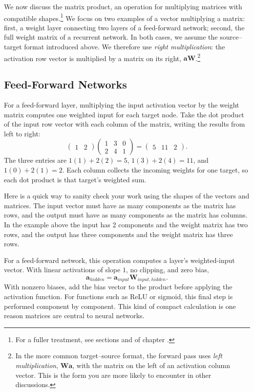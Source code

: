 We now discuss the matrix product, an operation for multiplying matrices with compatible shapes.\footnote{For a fuller treatment, see sections  and  of chapter .} We focus on two examples of a vector multiplying a matrix: first, a weight layer connecting two layers of a feed-forward network; second, the full weight matrix of a recurrent network. In both cases, we assume the source--target format introduced above. We therefore use \emph{right multiplication}: the activation row vector is multiplied by a matrix on its right, $\mathbf{a}\mathbf{W}$.\footnote{In the more common target--source format, the forward pass uses \emph{left multiplication}, $\mathbf{W}\mathbf{a}$, with the matrix on the left of an activation column vector. This is the form you are more likely to encounter in other discussions.}

\subsection{Feed-Forward Networks}

For a feed-forward layer, multiplying the input activation vector by the weight matrix computes one weighted input for each target node. Take the dot product of the input row vector with each column of the matrix, writing the results from left to right:
\[
\begin{pmatrix}1&2\end{pmatrix}
\begin{pmatrix}1&3&0\\2&4&1\end{pmatrix}
=\begin{pmatrix}5&11&2\end{pmatrix}.
\]
The three entries are $1(1)+2(2)=5$, $1(3)+2(4)=11$, and $1(0)+2(1)=2$. Each column collects the incoming weights for one target, so each dot product is that target's weighted sum.

Here is a quick way to sanity check your work using the shapes of the vectors and matrices. The input vector must have as many components as the matrix has rows, and the output must have as many components as the matrix has columns. In the example above the input has 2 components and the weight matrix has two rows, and the output has three components and the weight matrix has three rows.

For a feed-forward network, this operation computes a layer's weighted-input vector. With linear activations of slope $1$, no clipping, and zero bias,
\[
\mathbf{a}_{hidden}=\mathbf{a}_{input}\mathbf{W}_{input,hidden}.
\]
With nonzero biases, add the bias vector to the product before applying the activation function. For functions such as ReLU or sigmoid, this final step is performed component by component. This kind of  compact calculation is one reason matrices are central to neural networks.

